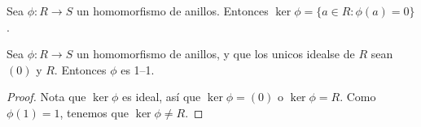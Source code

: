 \begin{definition}
    Sea $\phi:R \xrightarrow{} S$ un homomorfismo de anillos. Entonces
    $\ker{\phi}=\{a \in R : \phi(a)=0\}$.
\end{definition}

\begin{lemma}\label{}
    Sea $\phi:R \xrightarrow{} S$ un homomorfismo de anillos, y que los unicos
    idealse de $R$ sean  $(0)$ y $R$. Entonces $\phi$ es 1--1.
\end{lemma}
\begin{proof}
    Nota que $\ker{\phi}$ es ideal, as\'i que $\ker{\phi}=(0)$ o $\ker{\phi}=R$.
    Como $\phi(1)=1$, tenemos que $\ker{\phi} \neq R$.
\end{proof}
